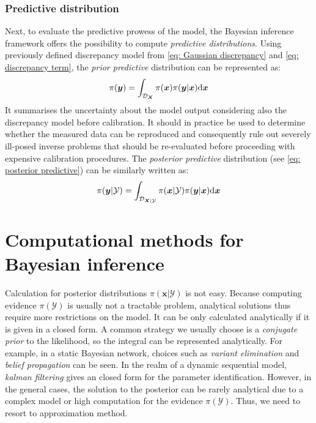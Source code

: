 \subsubsection{Predictive distribution}
Next, to evaluate the predictive prowess of the model, the Bayesian inference framework offers the possibility to compute \textit{predictive distributions}. Using previously defined discrepancy model from \cref{eq: Gaussian discrepancy} and \cref{eq: discrepancy term}, the \textit{prior predictive} distribution can be represented as:
\begin{equation}
    \label{eq: prior predictive}
    \pi(\boldsymbol{y}) = \int_{\mathcal{D}_{\boldsymbol{X}}} 
    \pi(\boldsymbol{x}) \pi(\boldsymbol{y}|\boldsymbol{x}) {\rm{d}} \boldsymbol{x}
\end{equation}
It summarises the uncertainty about the model output considering also the discrepancy model before calibration. It should in practice be used to determine whether the measured data can be reproduced and consequently rule out severely ill-posed inverse problems that should be re-evaluated before proceeding with expensive calibration procedures. The \textit{posterior predictive} distribution (see \cref{eq: posterior predictive}) can be similarly written as:
\begin{equation}
    \label{eq: posterior predictive}
    \pi(\boldsymbol{y}|\mathcal{Y}) = \int_{\mathcal{D}_{\boldsymbol{X}|\mathcal{Y}}} 
    \pi(\boldsymbol{x}|\mathcal{Y}) \pi(\boldsymbol{y}|\boldsymbol{x}) {\rm{d}} \boldsymbol{x}
\end{equation}
\section{Computational methods for Bayesian inference}
\label{section: Computational methods}
Calculation for posterior distributions $\pi(\boldsymbol{x}|\mathcal{Y})$ is not easy. Because computing evidence $\pi(\mathcal{Y})$ is usually not a tractable problem, analytical solutions thus require more restrictions on the model. It can be only calculated analytically if it is given in a closed form. A common strategy we usually choose is a \textit{conjugate prior} \citep{gelman1995} to the likelihood, so the integral can be represented analytically. For example, in a static Bayesian network, choices such as \textit{variant elimination} and \textit{belief propagation} \citep{murphy2012} can be seen. In the realm of a dynamic sequential model, \textit{kalman filtering} \citep{nguyen2016} gives an closed form for the parameter identification. However, in the general cases, the solution to the posterior can be rarely analytical due to a complex model or high computation for the evidence $\pi(\mathcal{Y})$. Thus, we need to resort to approximation method.

